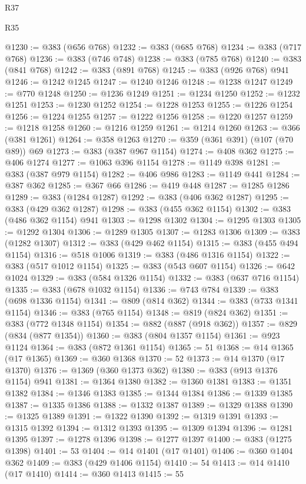 \begin{lexlean}{R37}
\begin{lexlean}{R35}
\begin{coremodule}
{{{{{{{{{{{{{{{{{{{{{{{{{{{{{{{{{{{{{{{{{{{{{{{{{{{{@1230 := @383 (@656 @768)
@1232 := @383 (@685 @768)
@1234 := @383 (@717 @768)
@1236 := @383 (@746 @748)
@1238 := @383 (@785 @768)
@1240 := @383 (@841 @768)
@1242 := @383 (@891 @768)
@1245 := @383 (@926 @768) @941
@1246 := @1242 @1245
@1247 := @1240 @1246
@1248 := @1238 @1247
@1249 := @770 @1248
@1250 := @1236 @1249
@1251 := @1234 @1250
@1252 := @1232 @1251
@1253 := @1230 @1252
@1254 := @1228 @1253
@1255 := @1226 @1254
@1256 := @1224 @1255
@1257 := @1222 @1256
@1258 := @1220 @1257
@1259 := @1218 @1258
@1260 := @1216 @1259
@1261 := @1214 @1260
@1263 := @366 (@381 @1261)
@1264 := @358 @1263
@1270 := @359 (@361 @391) (@107 (@70 @89)) @69
@1273 := @383 (@387 @967 @1154)
@1274 := @408 @362
@1275 := @406 @1274
@1277 := @1063 @396 @1154
@1278 := @1149 @398
@1281 := @383 (@387 @979 @1154)
@1282 := @406 @986
@1283 := @1149 @441
@1284 := @387 @362
@1285 := @367 @66
@1286 := @419 @448
@1287 := @1285 @1286
@1289 := @383 (@1284 @1287)
@1292 := @383 (@406 @362 @1287)
@1295 := @383 (@429 @362 @1287)
@1298 := @383 (@455 @362 @1154)
@1302 := @383 (@486 @362 @1154) @941
@1303 := @1298 @1302
@1304 := @1295 @1303
@1305 := @1292 @1304
@1306 := @1289 @1305
@1307 := @1283 @1306
@1309 := @383 (@1282 @1307)
@1312 := @383 (@429 @462 @1154)
@1315 := @383 (@455 @494 @1154)
@1316 := @518 @1006
@1319 := @383 (@486 @1316 @1154)
@1322 := @383 (@517 @1012 @1154)
@1325 := @383 (@543 @607 @1154)
@1326 := @642 @1024
@1329 := @383 (@584 @1326 @1154)
@1332 := @383 (@637 @716 @1154)
@1335 := @383 (@678 @1032 @1154)
@1336 := @743 @784
@1339 := @383 (@698 @1336 @1154)
@1341 := @809 (@814 @362)
@1344 := @383 (@733 @1341 @1154)
@1346 := @383 (@765 @1154)
@1348 := @819 (@824 @362)
@1351 := @383 (@772 @1348 @1154)
@1354 := @882 (@887 (@918 @362))
@1357 := @829 (@834 (@877 @1354))
@1360 := @383 (@804 @1357 @1154)
@1361 := @923 @1124
@1364 := @383 (@872 @1361 @1154)
@1365 := 51
@1368 := @14 @1365 (@17 @1365)
@1369 := @360 @1368
@1370 := 52
@1373 := @14 @1370 (@17 @1370)
@1376 := @1369 (@360 @1373 @362)
@1380 := @383 (@913 @1376 @1154) @941
@1381 := @1364 @1380
@1382 := @1360 @1381
@1383 := @1351 @1382
@1384 := @1346 @1383
@1385 := @1344 @1384
@1386 := @1339 @1385
@1387 := @1335 @1386
@1388 := @1332 @1387
@1389 := @1329 @1388
@1390 := @1325 @1389
@1391 := @1322 @1390
@1392 := @1319 @1391
@1393 := @1315 @1392
@1394 := @1312 @1393
@1395 := @1309 @1394
@1396 := @1281 @1395
@1397 := @1278 @1396
@1398 := @1277 @1397
@1400 := @383 (@1275 @1398)
@1401 := 53
@1404 := @14 @1401 (@17 @1401)
@1406 := @360 @1404 @362
@1409 := @383 (@429 @1406 @1154)
@1410 := 54
@1413 := @14 @1410 (@17 @1410)
@1414 := @360 @1413
@1415 := 55
}}}}}}}}}}}}}}}}}}}}}}}}}}}}}}}}}}}}}}}}}}}}}}}}}}}}
\end{coremodule}
\end{lexlean}
\end{lexlean}
